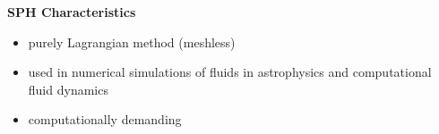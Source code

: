 \documentclass[portrait,a0paper,fontscale=0.292]{baposter}
\begin{document}
\begin{poster}
{		\textbf{SPH Characteristics}
		\vspace{-1mm}
		\begin{itemize}
			\item purely Lagrangian method (meshless)
			\item used in numerical simulations of fluids in astrophysics and computational fluid dynamics
			\item computationally demanding 
		\end{itemize}
	}

\end{poster}
\end{document}
